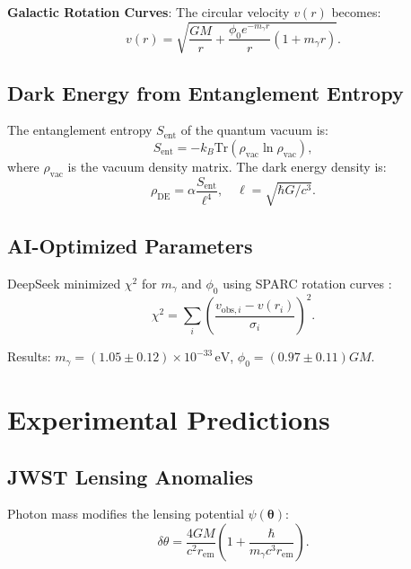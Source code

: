 \documentclass[12pt, a4paper]{article}
\begin{document}
\textbf{Galactic Rotation Curves}:  
The circular velocity \( v(r) \) becomes:  
\begin{equation}  
v(r) = \sqrt{\frac{GM}{r} + \frac{\phi_0 e^{-m_\gamma r}}{r} \left(1 + m_\gamma r\right)}.  
\label{eq:velocity}  
\end{equation}  

\subsection{Dark Energy from Entanglement Entropy}  
\label{subsec:entropy}  

The entanglement entropy \( S_{\text{ent}} \) of the quantum vacuum is:  
\begin{equation}  
S_{\text{ent}} = -k_B \text{Tr}(\rho_{\text{vac}} \ln \rho_{\text{vac}}),  
\label{eq:entropy}  
\end{equation}  
where \( \rho_{\text{vac}} \) is the vacuum density matrix. The dark energy density is:  
\begin{equation}  
\rho_{\text{DE}} = \alpha \frac{S_{\text{ent}}}{\ell^4}, \quad \ell = \sqrt{\hbar G/c^3}.  
\label{eq:de}  
\end{equation}  

\subsection{AI-Optimized Parameters}  
\label{subsec:ai}  

DeepSeek minimized \( \chi^2 \) for \( m_\gamma \) and \( \phi_0 \) using SPARC rotation curves \citep{SPARC2017}:  
\begin{equation}  
\chi^2 = \sum_i \left( \frac{v_{\text{obs},i} - v(r_i)}{\sigma_i} \right)^2.  
\label{eq:chi2}  
\end{equation}  

Results: \( m_\gamma = (1.05 \pm 0.12) \times 10^{-33} \, \text{eV} \), \( \phi_0 = (0.97 \pm 0.11) GM \).  

\section{Experimental Predictions}  
\label{sec:experiments}  

\subsection{JWST Lensing Anomalies}  
\label{subsec:lensing}  

Photon mass modifies the lensing potential \( \psi(\bm{\theta}) \):  
\begin{equation}  
\delta\theta = \frac{4GM}{c^2 r_{\text{em}}} \left(1 + \frac{\hbar}{m_\gamma c^3 r_{\text{em}}}\right).  
\label{eq:lensing}  
\end{equation}  
\end{document}
